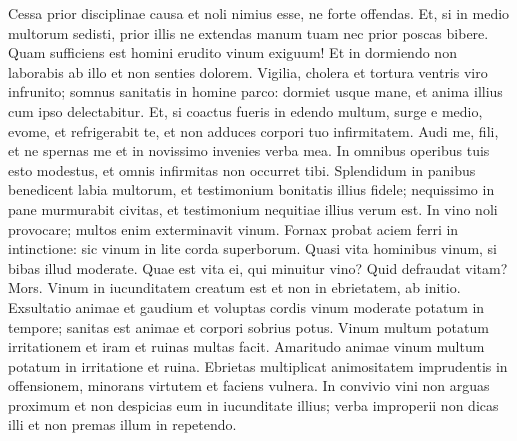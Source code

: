 \begin{biblechapter}
\begin{biblechapter}
\begin{biblechapter}
\begin{biblechapter}
\begin{biblechapter}
\begin{biblechapter}
\begin{biblechapter}
\begin{biblechapter}
\begin{biblechapter}
\begin{biblechapter}
\begin{biblechapter}
\begin{biblechapter}
\begin{biblechapter}
\begin{biblechapter}
\begin{biblechapter}
\begin{biblechapter}
\begin{biblechapter}
\begin{biblechapter}
\begin{biblechapter}
\begin{biblechapter}
\begin{biblechapter}
\begin{biblechapter}
\begin{biblechapter}
\begin{biblechapter}
\begin{biblechapter}
\begin{biblechapter}
\begin{biblechapter}
\begin{biblechapter}
\begin{biblechapter}
\begin{biblechapter}
\begin{biblechapter}
 \verse Cessa prior disciplinae causa
 et noli nimius esse, ne forte offendas.
 \verse Et, si in medio multorum sedisti,
 prior illis ne extendas manum tuam nec prior poscas bibere.
 \verse Quam sufficiens est homini erudito vinum exiguum!
 Et in dormiendo non laborabis ab illo et non senties dolorem.
 \verse Vigilia, cholera et tortura ventris viro infrunito;
 \verse somnus sanitatis in homine parco:
 dormiet usque mane, et anima illius cum ipso delectabitur.
 \verse Et, si coactus fueris in edendo multum,
 surge e medio, evome, et refrigerabit te,
 et non adduces corpori tuo infirmitatem.
 \verse Audi me, fili, et ne spernas me
 et in novissimo invenies verba mea.
 \verse In omnibus operibus tuis esto modestus,
 et omnis infirmitas non occurret tibi.
 \verse Splendidum in panibus benedicent labia multorum,
 et testimonium bonitatis illius fidele;
 \verse nequissimo in pane murmurabit civitas,
 et testimonium nequitiae illius verum est.
 \verse In vino noli provocare;
 multos enim exterminavit vinum.
 \verse Fornax probat aciem ferri in intinctione:
 sic vinum in lite corda superborum.
 \verse Quasi vita hominibus vinum,
 si bibas illud moderate.
 \verse Quae est vita ei, qui minuitur vino?
 \verse Quid defraudat vitam? Mors.
 \verse Vinum in iucunditatem creatum est
 et non in ebrietatem, ab initio.
 \verse Exsultatio animae et gaudium et voluptas cordis
 vinum moderate potatum in tempore;
 \verse sanitas est animae et corpori sobrius potus.
 \verse Vinum multum potatum irritationem
 et iram et ruinas multas facit.
 \verse Amaritudo animae vinum multum potatum
 in irritatione et ruina.
 \verse Ebrietas multiplicat animositatem imprudentis in offensionem,
 minorans virtutem et faciens vulnera.
 \verse In convivio vini non arguas proximum
 et non despicias eum in iucunditate illius;
 \verse verba improperii non dicas illi
 et non premas illum in repetendo.
 

\end{biblechapter}
\end{biblechapter}
\end{biblechapter}
\end{biblechapter}
\end{biblechapter}
\end{biblechapter}
\end{biblechapter}
\end{biblechapter}
\end{biblechapter}
\end{biblechapter}
\end{biblechapter}
\end{biblechapter}
\end{biblechapter}
\end{biblechapter}
\end{biblechapter}
\end{biblechapter}
\end{biblechapter}
\end{biblechapter}
\end{biblechapter}
\end{biblechapter}
\end{biblechapter}
\end{biblechapter}
\end{biblechapter}
\end{biblechapter}
\end{biblechapter}
\end{biblechapter}
\end{biblechapter}
\end{biblechapter}
\end{biblechapter}
\end{biblechapter}
\end{biblechapter}
